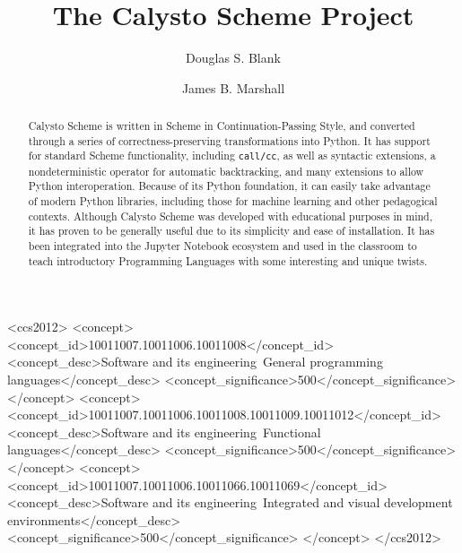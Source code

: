 \documentclass[acmsmall,screen,anonymous,review]{acmart}
\begin{document}
\title[Calysto Scheme]{The Calysto Scheme Project}

\author{Douglas S. Blank}

\author{James B. Marshall}

\renewcommand{\shortauthors}{D. S. Blank and J. B. Marshall}

\begin{abstract}
Calysto Scheme is written in Scheme in Continuation-Passing Style, and
converted through a series of correctness-preserving transformations into
Python. It has support for standard Scheme functionality, including
\texttt{call/cc}, as well as syntactic extensions, a nondeterministic operator
for automatic backtracking, and many extensions to allow Python
interoperation. Because of its Python foundation, it can easily take advantage
of modern Python libraries, including those for machine learning and other
pedagogical contexts. Although Calysto Scheme was developed with educational
purposes in mind, it has proven to be generally useful due to its simplicity
and ease of installation. It has been integrated into the Jupyter Notebook
ecosystem and used in the classroom to teach introductory Programming Languages
with some interesting and unique twists.
\end{abstract}

\begin{CCSXML}
<ccs2012>
<concept>
<concept_id>10011007.10011006.10011008</concept_id>
<concept_desc>Software and its engineering~General programming languages</concept_desc>
<concept_significance>500</concept_significance>
</concept>
<concept>
<concept_id>10011007.10011006.10011008.10011009.10011012</concept_id>
<concept_desc>Software and its engineering~Functional languages</concept_desc>
<concept_significance>500</concept_significance>
</concept>
<concept>
<concept_id>10011007.10011006.10011066.10011069</concept_id>
<concept_desc>Software and its engineering~Integrated and visual development environments</concept_desc>
<concept_significance>500</concept_significance>
</concept>
</ccs2012>
\end{CCSXML}
\end{document}

